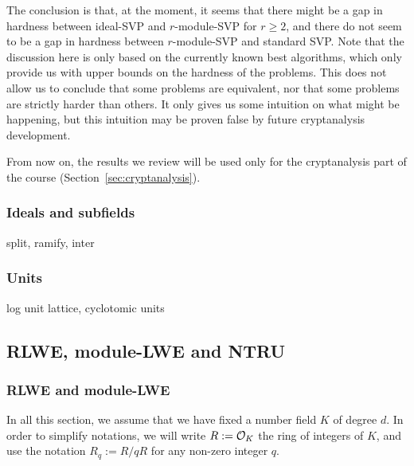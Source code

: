 The conclusion is that, at the moment, it seems that there might be a gap in hardness between ideal-SVP and $r$-module-SVP for $r \geq 2$, and there do not seem to be a gap in hardness between $r$-module-SVP and standard SVP. Note that the discussion here is only based on the currently known best algorithms, which only provide us with upper bounds on the hardness of the problems. This does not allow us to conclude that some problems are equivalent, nor that some problems are strictly harder than others. It only gives us some intuition on what might be happening, but this intuition may be proven false by future cryptanalysis development.


From now on, the results we review will be used only for the cryptanalysis part of the course (Section~\ref{sec:cryptanalysis}).

\subsubsection{Ideals and subfields}
split, ramify, inter

\subsubsection{Units}
log unit lattice, cyclotomic units



\subsection{RLWE, module-LWE and NTRU}
\label{sec:rlwe-mlwe-ntru}

\subsubsection{RLWE and module-LWE}
In all this section, we assume that we have fixed a number field $K$ of degree $d$. In order to simplify notations, we will write $R := \mathcal{O}_K$ the ring of integers of $K$, and use the notation $R_q := R/qR$ for any non-zero integer $q$.

